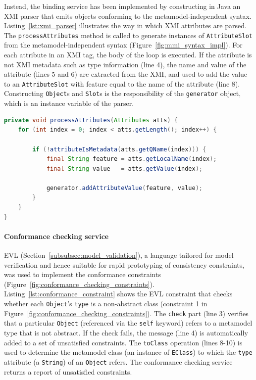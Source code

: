Instead, the binding service has been implemented by constructing in Java an XMI parser that emits objects conforming to the metamodel-independent syntax. Listing~\ref{lst:xmi_parser} illustrates the way in which XMI attributes are parsed. The \texttt{pr\-oc\-e\-ssAtt\-rib\-ut\-es} method is called to generate instances of \texttt{At\-tr\-ibu\-teSl\-ot} from the metamodel-independent syntax (Figure~\ref{fig:mmi_syntax_impl}). For each attribute in an XMI tag, the body of the loop is executed. If the attribute is not XMI metadata such as type information (line 4), the name and value of the attribute (lines 5 and 6) are extracted from the XMI, and used to add the value to an \texttt{At\-tr\-ibu\-teSl\-ot} with feature equal to the name of the attribute (line 8). Constructing \texttt{O\-bj\-e\-ct}s and \texttt{Sl\-ot}s is the responsibility of the \texttt{ge\-ne\-ra\-tor} object, which is an instance variable of the parser.


\begin{lstlisting}[caption=Parsing XMI attributes (in Java), label=lst:xmi_parser, language=Java]
private void processAttributes(Attributes atts) {
	for (int index = 0; index < atts.getLength(); index++) {
		
		if (!attributeIsMetadata(atts.getQName(index))) {
			final String feature = atts.getLocalName(index);
			final String value   = atts.getValue(index);
			
			generator.addAttributeValue(feature, value);
		}
	}
}
\end{lstlisting}

\paragraph{Conformance checking service} EVL (Section~\ref{subsubsec:model_validation}), a language tailored for model verification and hence suitable for rapid prototyping of consistency constraints, was used to implement the conformance constraints (Figure~\ref{fig:conformance_checking_constraints}). Listing~\ref{lst:conformance_constraint} shows the EVL constraint that checks whether each \texttt{Ob\-je\-ct}'s \texttt{ty\-pe} is a non-abstract class (constraint 1 in Figure~\ref{fig:conformance_checking_constraints}). The \texttt{ch\-e\-ck} part (line 3) verifies that a particular \texttt{Ob\-je\-ct} (referenced via the \texttt{se\-lf} keyword) refers to a metamodel type that is not abstract. If the check fails, the message (line 4) is automatically added to a set of unsatisfied constraints. The \texttt{toCl\-a\-ss} operation (lines 8-10) is used to determine the metamodel class (an instance of \texttt{EClass}) to which the \texttt{type} attribute (a \texttt{St\-ri\-ng}) of an \texttt{Ob\-je\-ct} refers. The conformance checking service returns a report of unsatisfied constraints.

